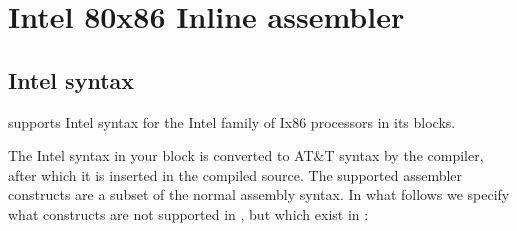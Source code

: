 \section{Intel 80x86 Inline assembler}

\subsection{Intel syntax}
\label{se:Intel}

\fpc supports Intel syntax for the Intel family of Ix86 processors
in its  blocks.

The Intel syntax in your  block is converted to AT\&T syntax by the
compiler, after which it is inserted in the compiled source.
The supported assembler constructs are a subset of the normal assembly
syntax. In what follows we specify what constructs are not supported in
\fpc, but which exist in \tp:

